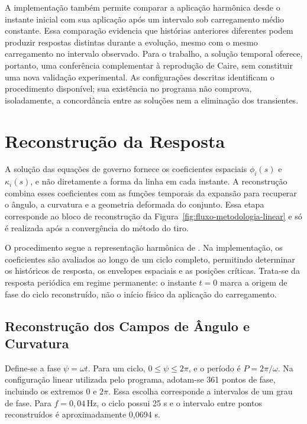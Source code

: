 \documentclass[arial,centeredequations,english,brazilian,oneside,section=TITLE]{ifes8}
\begin{document}
A implementação também permite comparar a aplicação harmônica desde o instante
inicial com sua aplicação após um intervalo sob carregamento médio constante.
Essa comparação evidencia que histórias anteriores diferentes podem produzir
respostas distintas durante a evolução, mesmo com o mesmo carregamento no
intervalo observado. Para o trabalho, a solução temporal oferece, portanto,
uma conferência complementar à reprodução de Caire, sem constituir uma nova
validação experimental. As configurações descritas identificam o procedimento
disponível; sua existência no programa não comprova, isoladamente, a concordância
entre as soluções nem a eliminação dos transientes.

\section{Reconstrução da Resposta}
\label{sec:reconstrucao-da-resposta}

A solução das equações de governo fornece os coeficientes espaciais
$\phi_i(s)$ e $\kappa_i(s)$, e não diretamente a forma da linha em cada
instante. A reconstrução combina esses coeficientes com as funções temporais
da expansão para recuperar o ângulo, a curvatura e a geometria deformada do
conjunto. Essa etapa corresponde ao bloco de reconstrução da
Figura~\ref{fig:fluxo-metodologia-linear} e só é realizada após a convergência
do método do tiro.

O procedimento segue a representação harmônica de
. Na implementação, os coeficientes são avaliados ao
longo de um ciclo completo, permitindo determinar os históricos de resposta,
os envelopes espaciais e as posições críticas. Trata-se da resposta periódica
em regime permanente: o instante $t=0$ marca a origem de fase do ciclo
reconstruído, não o início físico da aplicação do carregamento.

\subsection{Reconstrução dos Campos de Ângulo e Curvatura}
\label{sec:reconstrucao-campos-lineares}

Define-se a fase $\psi=\omega t$. Para um ciclo, $0\leq\psi\leq2\pi$, e
o período é $P=2\pi/\omega$. Na configuração linear utilizada pelo programa,
adotam-se 361 pontos de fase, incluindo os extremos 0 e $2\pi$. Essa escolha
corresponde a intervalos de um grau de fase. Para $f=0{,}04\,\mathrm{Hz}$,
o ciclo possui 25 s e o intervalo entre pontos reconstruídos é aproximadamente
0,0694 s.
\end{document}
